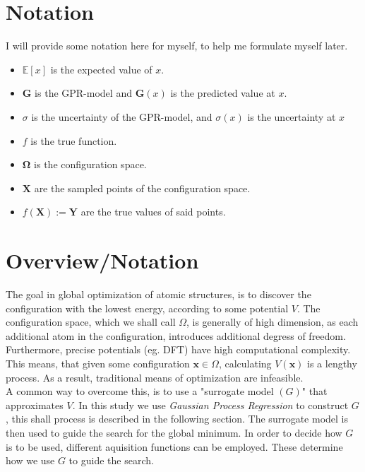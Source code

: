 \documentclass[working, oneside]{../../Preambles/tuftebook}
\begin{document}
\let\cleardoublepage\clearpage
\thispagestyle{fancy}

\section*{Notation}
I will provide some notation here for myself, to help me formulate myself later.
\begin{itemize}
    \item $\mathbb{E}\left[ x \right] $ is the expected value of $x$.
    \item $\bm{G}$ is the GPR-model and $\bm{G}\left( x \right)$ is the predicted value at $x$.
    \item $\sigma$ is the uncertainty of the GPR-model, and $\sigma\left( x \right) $ is the uncertainty at $x$
    \item $f$ is the true function.
    \item $\bm{\Omega}$ is the configuration space.
\item $\bm{X}$ are the sampled points of the configuration space.
\item $f\left( \bm{X} \right) := \bm{Y}$ are the true values of said points.
\end{itemize}
\section*{Overview/Notation}
The goal in global optimization of atomic structures, is to discover the configuration with the lowest energy, according to some potential $V$. The configuration space, which we shall call $\Omega$, is generally of high dimension, as each additional atom in the configuration, introduces additional degress of freedom. Furthermore, precise potentials (eg. DFT) have high computational complexity. This means, that given some configuration $\bm{x} \in \Omega$, calculating $V\left( \bm{x} \right) $ is a lengthy process. As a result, traditional means of optimization are infeasible. \\
A common way to overcome this, is to use a "surrogate model $(G)$" that approximates $V$. In this study we use \textit{Gaussian Process Regression} to construct $G$, this shall process is described in the following section. The surrogate model is then used to guide the search for the global minimum. In order to decide how $G$ is to be used, different aquisition functions can be employed. These determine how we use $G$ to guide the search. 
\end{document}
